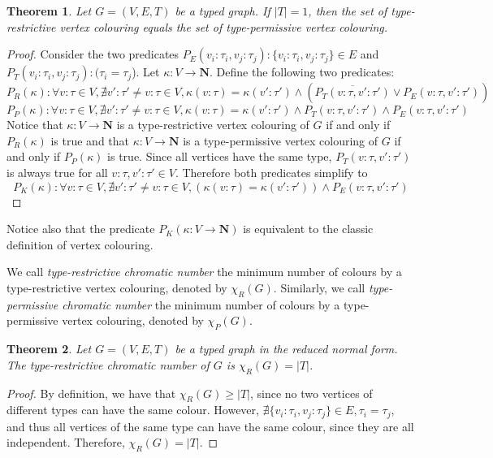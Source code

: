 \documentclass[preprint,12pt]{elsarticle}
\theoremstyle{plain}
\newtheorem{theorem}{Theorem}[section]
\newcommand\tyv[2]{#1\!\!:\!\!#2}
\begin{document}
\begin{theorem}\label{theorem:vertcolour}
Let $G = (V,E,T)$ be a typed graph.
If $|T|=1$, then
the set of type-restrictive vertex colouring equals
the set of type-permissive vertex colouring.
\end{theorem}
\begin{proof}
Consider the two predicates
$P_E(\tyv{v_i}{\tau_i}, \tyv{v_j}{\tau_j}): \{\tyv{v_i}{\tau_i}, \tyv{v_j}{\tau_j}\}\in E$
and
$P_T(\tyv{v_i}{\tau_i}, \tyv{v_j}{\tau_j}):(\tau_i=\tau_j$).
Let $\kappa:V\rightarrow \mathbf{N}$.
Define the following two predicates:
\[
P_R(\kappa)\!: \forall \tyv{v}{\tau}\in V, \nexists \tyv{v'}{\tau'}\neq \tyv{v}{\tau}\in V,
\kappa(\tyv{v}{\tau})=\kappa(\tyv{v'}{\tau'})\wedge(\overline{P_T(\tyv{v}{\tau},\tyv{v'}{\tau'})}\vee P_E(\tyv{v}{\tau},\tyv{v'}{\tau'}))
\]
\[
P_P(\kappa)\!: \forall \tyv{v}{\tau}\in V, \nexists \tyv{v'}{\tau'}\neq \tyv{v}{\tau}\in V,
\kappa(\tyv{v}{\tau})=\kappa(\tyv{v'}{\tau'})\wedge P_T(\tyv{v}{\tau},\tyv{v'}{\tau'})\wedge P_E(\tyv{v}{\tau},\tyv{v'}{\tau'})
\]
Notice that $\kappa:V\rightarrow \mathbf{N}$
is a type-restrictive vertex colouring of $G$
if and only if $P_R(\kappa)$ is true
and that
$\kappa:V\rightarrow \mathbf{N}$
is a type-permissive vertex colouring of $G$
if and only if $P_P(\kappa)$ is true.
Since all vertices have the same type,
$P_T(\tyv{v}{\tau},\tyv{v'}{\tau'})$ is
always true for all 
$\tyv{v}{\tau},\tyv{v'}{\tau'}\in V$.
Therefore both predicates simplify to
\[
P_K(\kappa): \forall \tyv{v}{\tau}\in V, \nexists \tyv{v'}{\tau'}\neq \tyv{v}{\tau}\in V,
(\kappa(\tyv{v}{\tau})=\kappa(\tyv{v'}{\tau'}))\wedge P_E(\tyv{v}{\tau},\tyv{v'}{\tau'})
\]
\end{proof}

Notice also that the predicate $P_K(\kappa:V\rightarrow \mathbf{N})$
is equivalent to the classic definition of vertex colouring.

We call
\textit{type-restrictive chromatic number} the
minimum number of colours by a type-restrictive vertex colouring, denoted by
$\chi_R(G)$.
Similarly, 
we call
\textit{type-permissive chromatic number} the
minimum number of colours by a type-permissive vertex colouring, denoted by
$\chi_P(G)$.

\begin{theorem}
Let $G = (V,E,T)$ be a typed graph in the reduced normal form.
The type-restrictive chromatic number of $G$ is $\chi_R(G)=|T|$.
\end{theorem}
\begin{proof}
By definition, we have that $\chi_R(G)\geq|T|$,
since no two vertices of different types can have the same colour.
However,
$\nexists \{\tyv{v_i}{\tau_i},\tyv{v_j}{\tau_j}\}\in E, \tau_i=\tau_j$,
and thus
all vertices of the same type can have the same colour,
since they are all independent.
Therefore, $\chi_R(G)=|T|$.
\end{proof}
\end{document}
